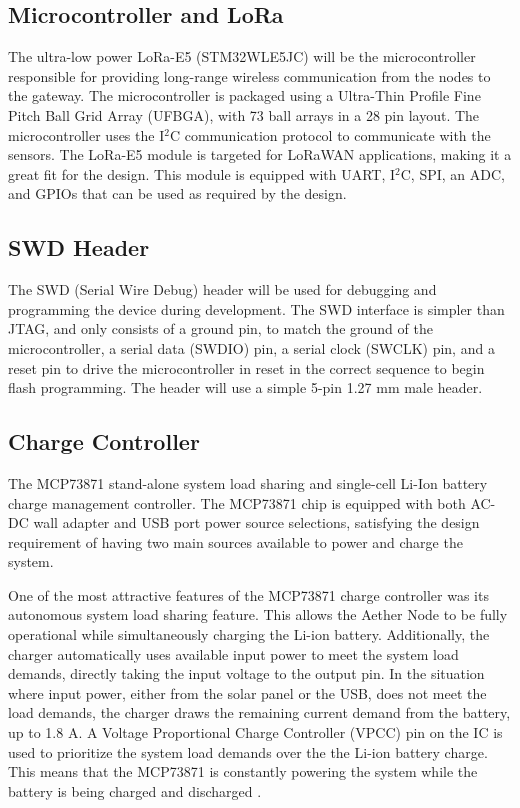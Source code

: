 \documentclass[conference]{IEEEtran}
\newcommand*{\iic}{I$^2$C\xspace}
\begin{document}
\subsection{Microcontroller and LoRa}
The ultra-low power LoRa-E5 (STM32WLE5JC) will be the microcontroller responsible for providing long-range wireless communication from the nodes to the gateway. The microcontroller is packaged using a Ultra-Thin Profile Fine Pitch Ball Grid Array (UFBGA), with 73 ball arrays in a 28 pin layout. The microcontroller uses the \iic communication protocol to communicate with the sensors. The LoRa-E5 module is targeted for LoRaWAN applications, making it a great fit for the design. This module is equipped with UART, \iic, SPI, an ADC, and GPIOs that can be used as required by the design.

 \subsection{SWD Header}
 The SWD (Serial Wire Debug) header will be used for debugging and programming the device during development. The SWD interface is simpler than JTAG, and only consists of a ground pin, to match the ground of the microcontroller, a serial data (SWDIO) pin, a serial clock (SWCLK) pin, and a reset pin to drive the microcontroller in reset in the correct sequence to begin flash programming. The header will use a simple 5-pin 1.27 mm male header.
 
\subsection{Charge Controller}
The MCP73871 stand-alone system load sharing and single-cell Li-Ion battery charge management controller. The MCP73871 chip is equipped with both AC-DC wall adapter and USB port power source selections, satisfying the design requirement of having two main sources available to power and charge the system.

One of the most attractive features of the MCP73871 charge controller was its autonomous system load sharing feature. This allows the Aether Node to be fully operational while simultaneously charging the Li-ion battery. Additionally, the charger automatically uses available input power to meet the system load demands, directly taking the input voltage to the output pin. In the situation where input power, either from the solar panel or the USB, does not meet the load demands, the charger draws the remaining current demand from the battery, up to 1.8 A. A Voltage Proportional Charge Controller (VPCC) pin on the IC is used to prioritize the system load demands over the the Li-ion battery charge. This means that the MCP73871 is constantly powering the system while the battery is being charged and discharged \cite{MCP73871-datasheet}.
\end{document}
